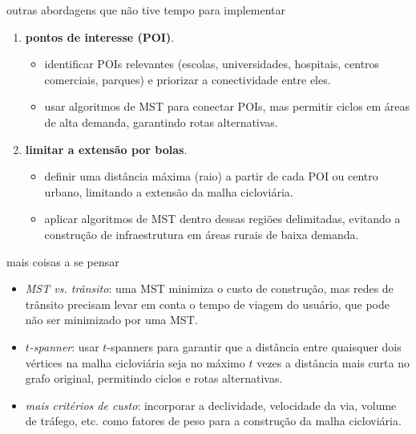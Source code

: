 \documentclass{beamer}
\begin{document}
\begin{frame}{outras abordagens que não tive tempo para implementar}
    \begin{enumerate}
        \item \textbf{pontos de interesse (POI)}.
            \begin{itemize}
                \item identificar POIs relevantes (escolas, universidades, hospitais, centros comerciais, parques) e priorizar a conectividade entre eles.
                \item usar algoritmos de MST para conectar POIs, mas permitir ciclos em áreas de alta demanda, garantindo rotas alternativas.
            \end{itemize}
        \item \textbf{limitar a extensão por bolas}.
            \begin{itemize}
                \item definir uma distância máxima (raio) a partir de cada POI ou centro urbano, limitando a extensão da malha cicloviária.
                \item aplicar algoritmos de MST dentro dessas regiões delimitadas, evitando a construção de infraestrutura em áreas rurais de baixa demanda.
            \end{itemize}
    \end{enumerate}
\end{frame}

\begin{frame}{mais coisas a se pensar}
    \begin{itemize}
        \item \emph{MST vs. trânsito}: uma MST minimiza o custo de construção, mas redes de trânsito precisam levar em conta o \alert{tempo de viagem} do usuário, que pode não ser minimizado por uma MST.
        \item \emph{$t$-spanner}: usar $t$-spanners para garantir que a distância entre quaisquer dois vértices na malha cicloviária seja no máximo \(t\) vezes a distância mais curta no grafo original, permitindo ciclos e rotas alternativas.
        \item \emph{mais critérios de custo}: incorporar a declividade, velocidade da via, volume de tráfego, etc. como fatores de peso para a construção da malha cicloviária.
    \end{itemize}
\end{frame}
\end{document}
